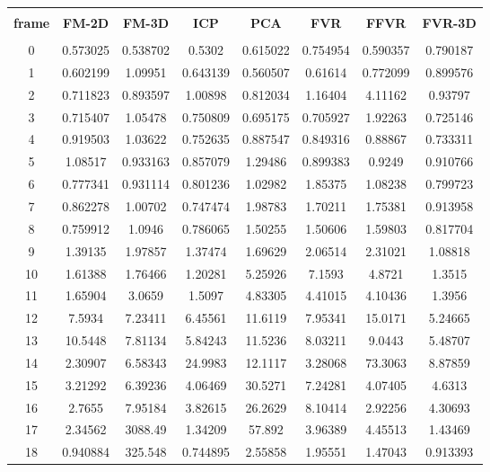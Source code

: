 \begin{center}
\begin{longtable}{cccccccc}
\hline \\
\textbf{frame} & \textbf{FM-2D} & \textbf{FM-3D} & \textbf{ICP} & \textbf{PCA} & \textbf{FVR} & \textbf{FFVR} & \textbf{FVR-3D} \\
\hline \\
0 & 0.573025 & 0.538702 & 0.5302 & 0.615022 & 0.754954 & 0.590357 & 0.790187\\
1 & 0.602199 & 1.09951 & 0.643139 & 0.560507 & 0.61614 & 0.772099 & 0.899576\\
2 & 0.711823 & 0.893597 & 1.00898 & 0.812034 & 1.16404 & 4.11162 & 0.93797\\
3 & 0.715407 & 1.05478 & 0.750809 & 0.695175 & 0.705927 & 1.92263 & 0.725146\\
4 & 0.919503 & 1.03622 & 0.752635 & 0.887547 & 0.849316 & 0.88867 & 0.733311\\
5 & 1.08517 & 0.933163 & 0.857079 & 1.29486 & 0.899383 & 0.9249 & 0.910766\\
6 & 0.777341 & 0.931114 & 0.801236 & 1.02982 & 1.85375 & 1.08238 & 0.799723\\
7 & 0.862278 & 1.00702 & 0.747474 & 1.98783 & 1.70211 & 1.75381 & 0.913958\\
8 & 0.759912 & 1.0946 & 0.786065 & 1.50255 & 1.50606 & 1.59803 & 0.817704\\
9 & 1.39135 & 1.97857 & 1.37474 & 1.69629 & 2.06514 & 2.31021 & 1.08818\\
10 & 1.61388 & 1.76466 & 1.20281 & 5.25926 & 7.1593 & 4.8721 & 1.3515\\
11 & 1.65904 & 3.0659 & 1.5097 & 4.83305 & 4.41015 & 4.10436 & 1.3956\\
12 & 7.5934 & 7.23411 & 6.45561 & 11.6119 & 7.95341 & 15.0171 & 5.24665\\
13 & 10.5448 & 7.81134 & 5.84243 & 11.5236 & 8.03211 & 9.0443 & 5.48707\\
14 & 2.30907 & 6.58343 & 24.9983 & 12.1117 & 3.28068 & 73.3063 & 8.87859\\
15 & 3.21292 & 6.39236 & 4.06469 & 30.5271 & 7.24281 & 4.07405 & 4.6313\\
16 & 2.7655 & 7.95184 & 3.82615 & 26.2629 & 8.10414 & 2.92256 & 4.30693\\
17 & 2.34562 & 3088.49 & 1.34209 & 57.892 & 3.96389 & 4.45513 & 1.43469\\
18 & 0.940884 & 325.548 & 0.744895 & 2.55858 & 1.95551 & 1.47043 & 0.913393\\

\end{longtable}
\end{center}

